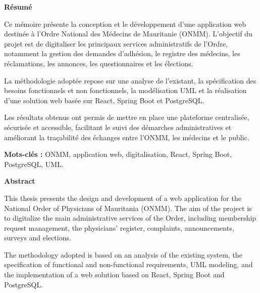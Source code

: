 ﻿\documentclass[12pt,a4paper]{report}
\begin{document}
\vspace{1cm}


\begin{center}
{\LARGE\bfseries Résumé}
\end{center}

\vspace{0.5cm}

Ce mémoire présente la conception et le développement d’une application web
destinée à l’Ordre National des Médecins de Mauritanie (ONMM). L’objectif du
projet est de digitaliser les principaux services administratifs de l’Ordre,
notamment la gestion des demandes d’adhésion, le registre des médecins, les
réclamations, les annonces, les questionnaires et les élections.

La méthodologie adoptée repose sur une analyse de l’existant, la spécification
des besoins fonctionnels et non fonctionnels, la modélisation UML et la
réalisation d’une solution web basée sur React, Spring Boot et PostgreSQL.

Les résultats obtenus ont permis de mettre en place une plateforme centralisée,
sécurisée et accessible, facilitant le suivi des démarches administratives et
améliorant la traçabilité des échanges entre l’ONMM, les médecins et le public.

\textbf{Mots-clés :}
ONMM, application web, digitalisation,
React, Spring Boot, PostgreSQL, UML.

\newpage


\begin{center}
{\LARGE\bfseries Abstract}
\end{center}

\vspace{0.5cm}

This thesis presents the design and development of a web application for the
National Order of Physicians of Mauritania (ONMM). The aim of the project is to
digitalize the main administrative services of the Order, including membership
request management, the physicians' register, complaints, announcements, surveys
and elections.

The methodology adopted is based on an analysis of the existing system, the
specification of functional and non-functional requirements, UML modeling, and the
implementation of a web solution based on React, Spring Boot and PostgreSQL.
\end{document}
